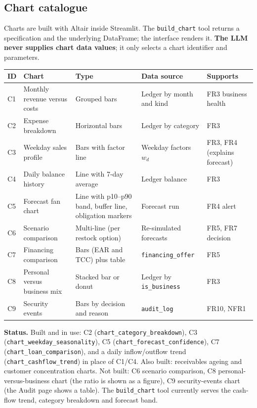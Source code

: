 \documentclass[10pt,a4paper]{article}
\newcommand{\code}[1]{\texttt{\small #1}}
\begin{document}
\subsection{Chart catalogue}
Charts are built with Altair inside Streamlit. The \code{build\_chart} tool returns a specification and the underlying DataFrame; the interface renders it. \textbf{The LLM never supplies chart data values}; it only selects a chart identifier and parameters.

\begin{longtable}{@{}p{0.8cm}p{3.2cm}p{2.6cm}p{4.2cm}p{3.1cm}@{}}
\toprule
\textbf{ID} & \textbf{Chart} & \textbf{Type} & \textbf{Data source} & \textbf{Supports}\\
\midrule\endhead
C1 & Monthly revenue versus costs & Grouped bars & Ledger by month and kind & FR3 business health\\
C2 & Expense breakdown & Horizontal bars & Ledger by category & FR3\\
C3 & Weekday sales profile & Bars with factor line & Weekday factors $w_d$ & FR3, FR4 (explains forecast)\\
C4 & Daily balance history & Line with 7-day average & Ledger balance & FR3\\
C5 & Forecast fan chart & Line with p10--p90 band, buffer line, obligation markers & Forecast run & FR4 alert\\
C6 & Scenario comparison & Multi-line (per restock option) & Re-simulated forecasts & FR5, FR7 decision\\
C7 & Financing comparison & Bars (EAR and TCC) plus table & \code{financing\_offer} & FR5\\
C8 & Personal versus business mix & Stacked bar or donut & Ledger by \code{is\_business} & FR3\\
C9 & Security events & Bars by decision and reason & \code{audit\_log} & FR10, NFR1\\
\bottomrule
\end{longtable}

\textbf{Status.} Built and in use: C2 (\code{chart\_category\_breakdown}), C3 (\code{chart\_weekday\_seasonality}), C5 (\code{chart\_forecast\_confidence}), C7 (\code{chart\_loan\_comparison}), and a daily inflow/outflow trend (\code{chart\_cashflow\_trend}) in place of C1/C4. Also built: receivables ageing and customer concentration charts. Not built: C6 scenario comparison, C8 personal-versus-business chart (the ratio is shown as a figure), C9 security-events chart (the Audit page shows a table). The \code{build\_chart} tool currently serves the cash-flow trend, category breakdown and forecast band.
\end{document}
